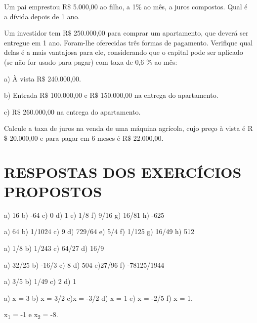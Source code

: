 \begin{exercicios}
\exitem{} Um pai emprestou R$\$$  5.000,00 ao filho, a 1$\%$  ao mês, a juros compostos. Qual é a dívida depois de 1 ano.

\exitem{} Um investidor tem R$\$$  250.000,00 para comprar um apartamento, que deverá ser entregue em 1 ano. Foram-lhe oferecidas três formas de pagamento. Verifique qual delas é a mais vantajosa para ele, considerando que o capital pode ser aplicado (se não for usado para pagar) com taxa de 0,6 $\%$  ao mês:

a) À vista R$\$$  240.000,00.

b) Entrada R$\$$  100.000,00 e R$\$$  150.000,00 na entrega do apartamento.

c) R$\$$  260.000,00 na entrega do apartamento.

\exitem{} Calcule a taxa de juros na venda de uma máquina agrícola, cujo preço à vista é R$\$$  20.000,00 e para pagar em 6 meses é R$\$$ 22.000,00.  
\end{exercicios}

\section{RESPOSTAS DOS EXERCÍCIOS PROPOSTOS}

\begin{respostas}{2}
	\ansitem{} a) 16 b) -64  c) 0 d) 1 e) 1/8  f) 9/16 g) 16/81 h) -625

	\ansitem{} a) 64 b) 1/1024 c) 9 d) 729/64 e) 5/4 f) 1/125  g) 16/49 h) 512

    \ansitem{} a) 1/8 b) 1/243  c) 64/27 d) 16/9
    
    \setcounter{enumi}{5}

	\ansitem{} a) 32/25 b) -16/3  c) 8  d) 504  e)27/96  f) -78125/1944

	\ansitem{} a) 3/5 b) 1/49  c) 2  d) 1

	\ansitem{} a) x = 3 b) x = 3/2  c)x = -3/2   d) x = 1  e) x = -2/5 f) x = 1.

    \ansitem{} x\textsubscript{1 }= -1 e x\textsubscript{2} = -8.
\end{respostas}

